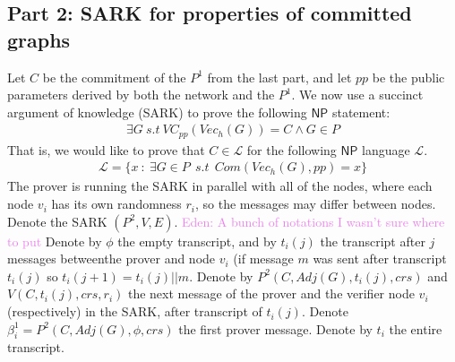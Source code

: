 \documentclass{llncs}
\numberwithin{equation}{section}
\numberwithin{figure}{section}
\theoremstyle{definition}
\newcommand{\Enote}[1]{\textcolor{violet}{Eden: #1}}
\newcommand{\Lan}{\ensuremath{\mathcal{L}}}
\newcommand{\NP}{\mathsf{NP}}
\begin{document}
\subsection{Part 2: SARK for properties of committed graphs}\label{SARK}
Let $C$ be the commitment of the $P^1$ from the last part, and let $pp$ be the public parameters derived by both the network and the $P^1$.
We now use a succinct argument of knowledge (SARK) to prove the following $\NP$ statement:
\begin{gather*}
    \exists G\ s.t\ VC_{pp}(Vec_h(G)) = C \wedge G\in P
\end{gather*}
That is, we would like to prove that $C\in \mathcal{L}$ for the following $\NP$ language $\Lan$.
\begin{gather*}
    \mathcal{L} = \{x\ :\ \exists G\in P\ \ s.t\ \ Com(Vec_h(G), pp) = x\}
\end{gather*}
The prover is running the SARK in parallel with all of the nodes, where each node $v_i$ has its own randomness $r_i$, so the messages may differ between nodes. Denote the SARK $(P^2, V, E)$.
\Enote{A bunch of notations I wasn't sure where to put}
Denote by $\phi$ the empty transcript, and by $t_i(j)$ the transcript after $j$ messages betweenthe prover and node $v_i$ (if message $m$ was sent after transcript $t_i(j)$ so $t_i(j+1)=t_i(j)||m$. Denote by $P^2(C, Adj(G), t_i(j), crs)$ and $V(C,t_i(j),crs, r_i)$ the next message of the prover and the verifier  node $v_i$ (respectively) in the SARK, after transcript of $t_i(j)$. Denote $\beta_i^1 = P^2(C, Adj(G), \phi, crs)$ the first prover message. Denote by $t_i$ the entire transcript.

\end{document}
